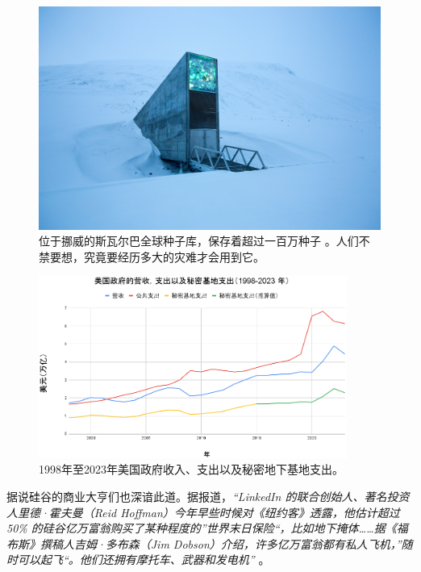 \documentclass[10pt,twocolumn,letterpaper]{article}
\begin{document}
\begin{figure}[t]
\begin{center}
   \includegraphics[width=1\linewidth]{svalbard.jpg}
\end{center}
   \caption{位于挪威的斯瓦尔巴全球种子库，保存着超过一百万种子 \cite{24}。人们不禁要想，究竟要经历多大的灾难才会用到它。}
\label{fig:8}
\label{fig:onecol}
\end{figure}

\begin{figure}[t]
\begin{center}
\includegraphics[width=0.9\textwidth]{govchn.png}
\end{center}
   \caption{1998年至2023年美国政府收入、支出以及秘密地下基地支出\cite{19}。}
   \label{fig:9}
\end{figure}

据说硅谷的商业大亨们也深谙此道。据报道，\textit{“LinkedIn 的联合创始人、著名投资人里德·霍夫曼（Reid Hoffman）今年早些时候对《纽约客》透露，他估计超过 50\% 的硅谷亿万富翁购买了某种程度的”世界末日保险“，比如地下掩体……据《福布斯》撰稿人吉姆·多布森（Jim Dobson）介绍，许多亿万富翁都有私人飞机，”随时可以起飞“。他们还拥有摩托车、武器和发电机”} \cite{28}。
\end{document}
